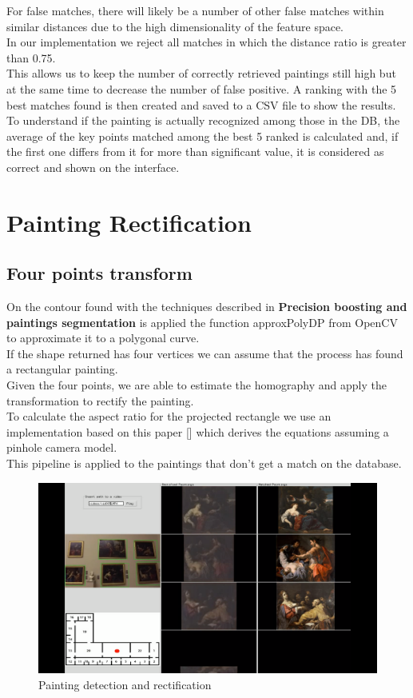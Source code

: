 \documentclass[conference]{IEEEtran}
\begin{document}
For false matches, there will likely be a number of other false matches within similar distances due to the high dimensionality of the feature space.\\
In our implementation we reject all matches in which the distance ratio is greater than 0.75.\\
This allows us to keep the number of correctly retrieved paintings still high but at the same time to decrease the number of false positive.
A ranking with the 5 best matches found is then created and saved to a CSV file to show the results.\\
To understand if the painting is actually recognized among those in the DB, the average of the key points matched among the best 5 ranked is calculated and, if the first one differs from it for more than significant value, it is considered as correct and shown on the interface.


\section{Painting Rectification}
\subsection{Four points transform}
On the contour found with the techniques described in \textbf{Precision boosting and paintings segmentation} is applied the function approxPolyDP from OpenCV to approximate it to a polygonal curve.\\
If the shape returned has four vertices we can assume that the process has found a rectangular painting.\\
Given the four points, we are able to estimate the homography and apply the transformation to rectify the painting.\\
To calculate the aspect ratio for the projected rectangle we use an implementation based on this paper [] which derives the equations assuming a pinhole camera model.\\
This pipeline is applied to the paintings that don't get a match on the database.

\begin{figure}[htbp]
\centerline{\includegraphics[width=0.8\columnwidth]{../detection_and_rectification/top_association_vid05.png}}
\caption{Painting detection and rectification}
\label{fig_Painting_detection_and_rectification}
\end{figure}
\end{document}
